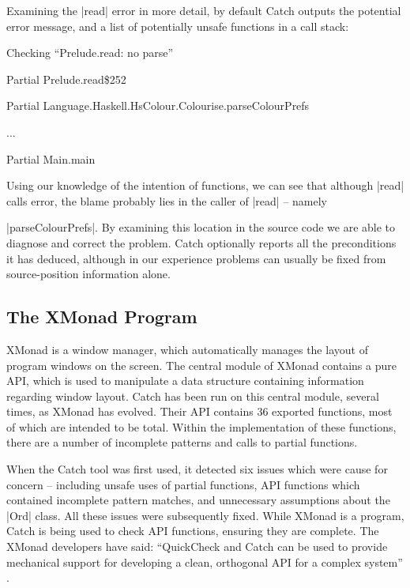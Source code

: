 \documentclass[preprint]{sigplanconf}
\begin{document}
Examining the |read| error in more detail, by default Catch outputs the potential error message, and a list of potentially unsafe functions in a call stack:

\smallskip
\par\noindent\textsf{Checking ``Prelude.read: no parse''}
\par\noindent\textsf{Partial Prelude.read\$252}
\par\noindent\textsf{Partial Language.Haskell.HsColour.Colourise.parseColourPrefs}
\par\noindent\textsf{...}
\par\noindent\textsf{Partial Main.main}
\smallskip

Using our knowledge of the intention of functions, we can see that although |read| calls error, the blame probably lies in the caller of |read| -- namely \ignore|parseColourPrefs|. By examining this location in the source code we are able to diagnose and correct the problem. Catch optionally reports all the preconditions it has deduced, although in our experience problems can usually be fixed from source-position information alone.

\subsection{The XMonad Program}
\label{sec:xmonad}

XMonad \cite{xmonad} is a window manager, which automatically manages the layout of program windows on the screen. The central module of XMonad contains a pure API, which is used to manipulate a data structure containing information regarding window layout. Catch has been run on this central module, several times, as XMonad has evolved. Their API contains 36 exported functions, most of which are intended to be total. Within the implementation of these functions, there are a number of incomplete patterns and calls to partial functions.

When the Catch tool was first used, it detected six issues which were cause for concern -- including unsafe uses of partial functions, API functions which contained incomplete pattern matches, and unnecessary assumptions about the |Ord| class. All these issues were subsequently fixed. While XMonad is a program, Catch is being used to check API functions, ensuring they are complete. The XMonad developers have said: ``QuickCheck and Catch can be used to provide mechanical support for developing a clean, orthogonal API for a complex system'' \cite{xmonad}.
\end{document}
